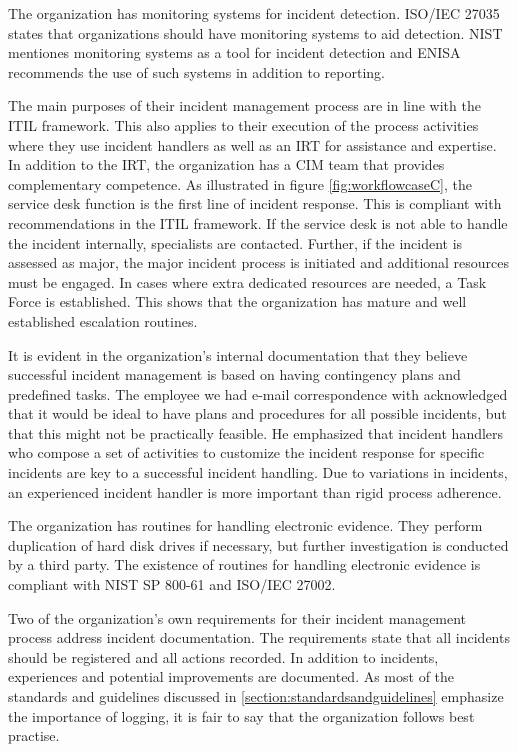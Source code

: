 The organization has monitoring systems for incident detection. ISO/IEC 27035 states that organizations should have monitoring systems to aid detection. NIST mentiones monitoring systems as a tool for incident detection and ENISA recommends the use of such systems in addition to reporting. 

The main purposes of their incident management process are in line with the ITIL framework. This also applies to their execution of the process activities where they use incident handlers as well as an \ac{IRT} for assistance and expertise. In addition to the IRT, the organization has a \ac{CIM} team that provides complementary competence. As illustrated in figure \ref{fig:workflowcaseC}, the service desk function is the first line of incident response. This is compliant with recommendations in the ITIL framework. If the service desk is not able to handle the incident internally, specialists are contacted. Further, if the incident is assessed as major, the major incident process is initiated and additional resources must be engaged. In cases where extra dedicated resources are needed, a Task Force is established. This shows that the organization has mature and well established escalation routines.

It is evident in the organization's internal documentation that they believe successful incident management is based on having contingency plans and predefined tasks. The employee we had e-mail correspondence with acknowledged that it would be ideal to have plans and procedures for all possible incidents, but that this might not be practically feasible. He emphasized that incident handlers who compose a set of activities to customize the incident response for specific incidents are key to a successful incident handling. Due to variations in incidents, an experienced incident handler is more important than rigid process adherence.

The organization has routines for handling electronic evidence. They perform duplication of hard disk drives if necessary, but further investigation is conducted by a third party. The existence of routines for handling electronic evidence is compliant with NIST SP 800-61 and ISO/IEC 27002.

Two of the organization's own requirements for their incident management process address incident documentation. The requirements state that all incidents should be registered and all actions recorded. In addition to incidents, experiences and potential improvements are documented. As most of the standards and guidelines discussed in \ref{section:standardsandguidelines} emphasize the importance of logging, it is fair to say that the organization follows best practise.

